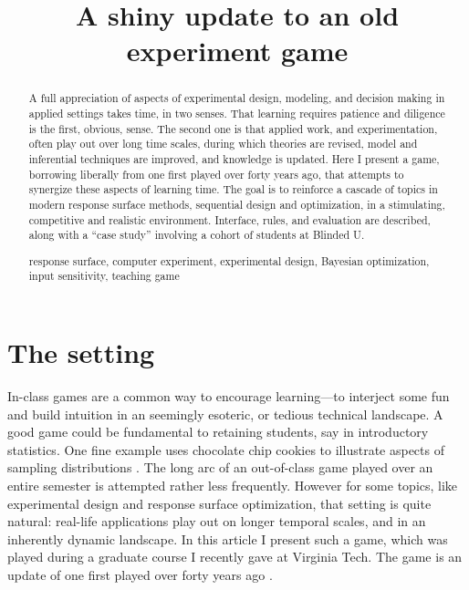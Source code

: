 \documentclass[12pt]{article}
\begin{document}


\title{\vspace{-1cm}
A shiny update to an old experiment game}
\author{
}
\date{}
\maketitle


\begin{abstract}
A full appreciation of aspects of experimental design, modeling, and
decision making in applied settings takes time, in two senses. That learning
requires patience and diligence is the first, obvious, sense. The second one
is that applied work, and experimentation, often play out over long time
scales, during which theories are revised, model and inferential techniques
are improved, and knowledge is updated. Here I present a game,
borrowing liberally from one first played over forty years ago, that attempts
to synergize these aspects of learning time.   The goal is to reinforce a
cascade of topics in modern response surface methods, sequential design and
optimization, in a stimulating, competitive and realistic environment.
Interface, rules, and evaluation are described, along with a ``case study''
involving a cohort of students at Blinded U.

  \bigskip
  response surface, computer experiment, experimental design, Bayesian optimization, input sensitivity, teaching game
\end{abstract}


\doublespacing

\section{The setting}
\label{sec:intro}


In-class games are a common way to encourage learning---to interject some fun
and build intuition in an seemingly esoteric, or tedious technical landscape.
A good game could be fundamental to retaining students, say in introductory
statistics.  One fine example uses chocolate chip cookies to illustrate
aspects of sampling distributions \citep{lee:2007}.  The long arc of an
out-of-class game played over an entire semester is attempted rather less
frequently. However for some topics, like experimental design and response
surface optimization, that setting is quite natural: real-life applications
play out on longer temporal scales, and in an inherently dynamic landscape. In
this article I present such a game, which was played during a graduate
course I recently gave at Virginia Tech. The game is an update of one
first played over forty years ago \citep{mead:freeman:1973}.
\end{document}
